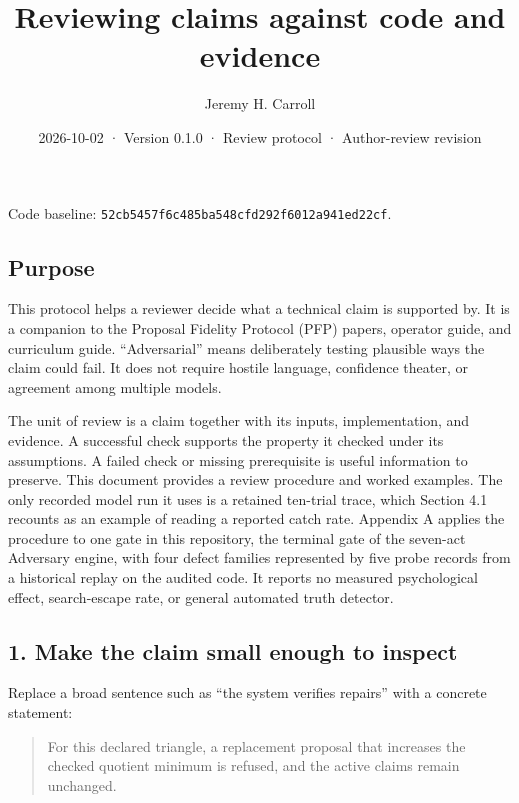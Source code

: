 \documentclass[
  11pt,
]{article}
\title{Reviewing claims against code and evidence}
\author{Jeremy H. Carroll}
\date{2026-10-02 · Version 0.1.0 · Review protocol · Author-review revision}
\newcommand{\passthrough}[1]{#1}
\begin{document}
\makeatletter
\begin{center}
{\LARGE \@title\par}
\vspace{0.8em}
{\normalsize \@author\par}
\vspace{0.5em}
{\small \@date\par}
\end{center}
\makeatother
Code baseline:
\passthrough{\lstinline!52cb5457f6c485ba548cfd292f6012a941ed22cf!}.

\hypertarget{purpose}{%
\subsection{Purpose}\label{purpose}}

This protocol helps a reviewer decide what a technical claim is
supported by. It is a companion to the Proposal Fidelity Protocol (PFP)
papers, operator guide, and curriculum guide. ``Adversarial'' means
deliberately testing plausible ways the claim could fail. It does not
require hostile language, confidence theater, or agreement among
multiple models.

The unit of review is a claim together with its inputs, implementation,
and evidence. A successful check supports the property it checked under
its assumptions. A failed check or missing prerequisite is useful
information to preserve. This document provides a review procedure and
worked examples. The only recorded model run it uses is a retained
ten-trial trace, which Section 4.1 recounts as an example of reading a
reported catch rate. Appendix A applies the procedure to one gate in
this repository, the terminal gate of the seven-act Adversary engine, with
four defect families represented by five probe records from a historical
replay on the audited code. It reports no measured psychological effect,
search-escape rate, or general automated truth detector.

\hypertarget{make-the-claim-small-enough-to-inspect}{%
\subsection{1. Make the claim small enough to
inspect}\label{make-the-claim-small-enough-to-inspect}}

Replace a broad sentence such as ``the system verifies repairs'' with a
concrete statement:

\begin{quote}
For this declared triangle, a replacement proposal that increases the
checked quotient minimum is refused, and the active claims remain
unchanged.
\end{quote}
\end{document}
